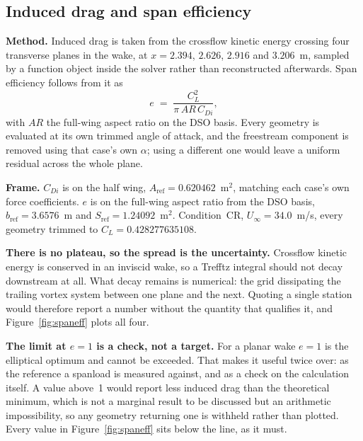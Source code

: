 \subsection{Induced drag and span efficiency}
\label{sec:cr:spaneff}
\label{sec:spaneff}
\textbf{Method.} Induced drag is taken from the crossflow kinetic energy crossing four
transverse planes in the wake, at $x = 2.394$, $2.626$, $2.916$ and $3.206$~m, sampled by a
function object inside the solver rather than reconstructed afterwards. Span efficiency
follows from it as
%
\begin{equation}
  e \;=\; \frac{C_L^{2}}{\pi \, AR \, C_{Di}} ,
  \label{eq:spaneff}
\end{equation}
%
with $AR$ the full-wing aspect ratio on the DSO basis. Every geometry is evaluated at its
own trimmed angle of attack, and the freestream component is removed using that case's own
$\alpha$; using a different one would leave a uniform residual across the whole plane.

\textbf{Frame.} $C_{Di}$ is on the half wing, $A_\mathrm{ref} = 0.620462$~m$^2$, matching
each case's own force coefficients. $e$ is on the full-wing aspect ratio from the DSO basis,
$b_\mathrm{ref} = 3.6576$~m and $S_\mathrm{ref} = 1.24092$~m$^2$. Condition~CR,
$U_\infty = 34.0$~m/s, every geometry trimmed to $C_L = 0.428277635108$.

\textbf{There is no plateau, so the spread is the uncertainty.} Crossflow kinetic energy is
conserved in an inviscid wake, so a Trefftz integral should not decay downstream at all.
What decay remains is numerical: the grid dissipating the trailing vortex system between one
plane and the next. Quoting a single station would therefore report a number without the
quantity that qualifies it, and Figure~\ref{fig:spaneff} plots all four.

\textbf{The limit at $e = 1$ is a check, not a target.}
For a planar wake $e = 1$ is the elliptical optimum and cannot be exceeded. That makes it
useful twice over: as the reference a spanload is measured against, and as a check on the
calculation itself. A value above~1 would report less induced drag than the theoretical
minimum, which is not a marginal result to be discussed but an arithmetic impossibility, so
any geometry returning one is withheld rather than plotted. Every value in
Figure~\ref{fig:spaneff} sits below the line, as it must.



